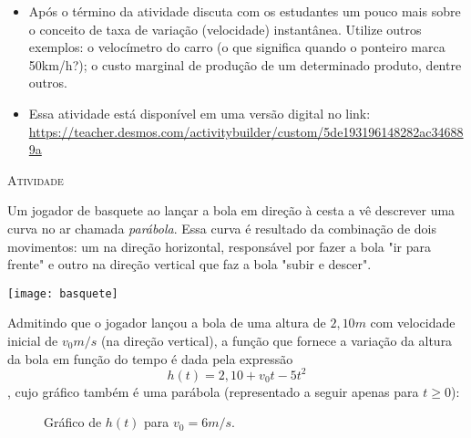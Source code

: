 \documentclass[10 pt,usenames,dvipsnames, oneside]{article}
\begin{document}
\begin{goals}
\begin{itemize}
\begin{figure}[H]
\begin{tikzpicture}[xscale=2.8,scale=1.1]
  \end{tikzpicture}
\end{figure}



\item Após o término da atividade discuta com os estudantes um pouco mais sobre o conceito
de taxa de variação (velocidade) instantânea. Utilize outros exemplos: o velocímetro do
carro (o que significa quando o ponteiro marca 50km/h?); o custo marginal de
produção de um determinado produto, dentre outros.

\item Essa atividade está disponível em uma versão digital no link: \url{https://teacher.desmos.com/activitybuilder/custom/5de193196148282ac346889a}

\end{itemize}

\end{goals}

\bigskip
\begin{center}
{\large \scshape Atividade}
\end{center}
\fi

Um jogador de basquete ao lançar a bola em direção à cesta a vê descrever uma curva no ar chamada \textit{parábola}. Essa curva é resultado da combinação de dois movimentos: um na direção horizontal, responsável por fazer a bola "ir para frente" e outro na direção vertical que faz a bola "subir e descer".

\begin{center}
\texttt{[image: basquete]}  
\end{center}

Admitindo que o jogador lançou a bola de uma altura de $2{,}10m$ com velocidade inicial de $v_0 m/s$ (na direção vertical), a função que fornece a variação da altura da bola em função do tempo é dada pela expressão
\[h(t) = 2,10 + v_0 t - 5t^2\],
cujo gráfico também é uma parábola (representado a seguir apenas para $t\geq 0$):

\begin{figure}[H]
\centering

\caption{Gráfico de $h(t)$ para $v_0 = 6m/s$.}
\end{figure}
\end{document}
